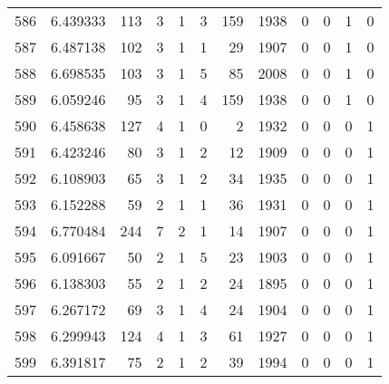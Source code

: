 \begin{tabular}{lrrrrrrrrrrr}
586 &  6.439333 &  113 &      3 &        1 &      3 &             159 &  1938 &               0 &               0 &               1 &               0 \\
587 &  6.487138 &  102 &      3 &        1 &      1 &              29 &  1907 &               0 &               0 &               1 &               0 \\
588 &  6.698535 &  103 &      3 &        1 &      5 &              85 &  2008 &               0 &               0 &               1 &               0 \\
589 &  6.059246 &   95 &      3 &        1 &      4 &             159 &  1938 &               0 &               0 &               1 &               0 \\
590 &  6.458638 &  127 &      4 &        1 &      0 &               2 &  1932 &               0 &               0 &               0 &               1 \\
591 &  6.423246 &   80 &      3 &        1 &      2 &              12 &  1909 &               0 &               0 &               0 &               1 \\
592 &  6.108903 &   65 &      3 &        1 &      2 &              34 &  1935 &               0 &               0 &               0 &               1 \\
593 &  6.152288 &   59 &      2 &        1 &      1 &              36 &  1931 &               0 &               0 &               0 &               1 \\
594 &  6.770484 &  244 &      7 &        2 &      1 &              14 &  1907 &               0 &               0 &               0 &               1 \\
595 &  6.091667 &   50 &      2 &        1 &      5 &              23 &  1903 &               0 &               0 &               0 &               1 \\
596 &  6.138303 &   55 &      2 &        1 &      2 &              24 &  1895 &               0 &               0 &               0 &               1 \\
597 &  6.267172 &   69 &      3 &        1 &      4 &              24 &  1904 &               0 &               0 &               0 &               1 \\
598 &  6.299943 &  124 &      4 &        1 &      3 &              61 &  1927 &               0 &               0 &               0 &               1 \\
599 &  6.391817 &   75 &      2 &        1 &      2 &              39 &  1994 &               0 &               0 &               0 &               1 \\

\end{tabular}
